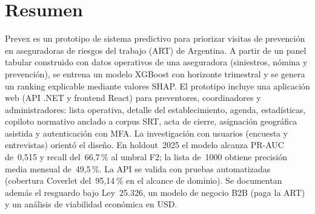 \chapter*{Resumen}

Prevex es un prototipo de sistema predictivo para priorizar visitas de prevenci\'on en aseguradoras de riesgos del trabajo (ART) de Argentina.
A partir de un panel tabular construido con datos operativos de una aseguradora (siniestros, n\'omina y prevenci\'on), se entrena un modelo XGBoost con horizonte trimestral y se genera un ranking explicable mediante valores SHAP.
El prototipo incluye una aplicaci\'on web (API .NET y frontend React) para preventores, coordinadores y administradores: lista operativa, detalle del establecimiento, agenda, estad\'isticas, copiloto normativo anclado a corpus SRT, acta de cierre, asignaci\'on geogr\'afica asistida y autenticaci\'on con MFA.
La investigaci\'on con usuarios (encuesta y entrevistas) orient\'o el dise\~no.
En holdout~2025 el modelo alcanza PR-AUC de~0,515 y recall del~66,7\,\% al umbral F2; la lista de~1000 obtiene precisi\'on media mensual de~49,5\,\%.
La API se valida con pruebas automatizadas (cobertura Coverlet del~95,14\,\% en el alcance de dominio).
Se documentan adem\'as el resguardo bajo Ley~25.326, un modelo de negocio B2B (paga la ART) y un an\'alisis de viabilidad econ\'omica en USD.
